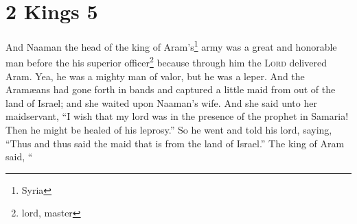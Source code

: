 \section{2 Kings 5}\label{2 Kings 5}
\begin{enumerate}[align=center]
     And Naaman the head of the king of Aram's\footnote{Syria} army was a great and honorable man before the his superior officer\footnote{lord, master} because through him the \textsc{Lord} delivered Aram. Yea, he was a mighty man of valor, but he was a leper.%
     And the Aram\ae{}ans had gone forth in bands and captured a little maid from out of the land of Israel; and she waited upon Naaman's wife.%
     And she said unto her maidservant, ``I wish that my lord was in the presence of the prophet in Samaria! Then he might be healed of his leprosy.''%
     So he went and told his lord, saying, ``Thus and thus said the maid that is from the land of Israel.''%
     The king of Aram said, ``%
\end{enumerate}
